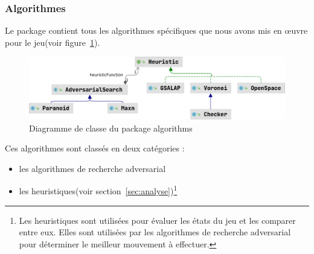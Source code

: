 \subsubsection{Algorithmes}
Le package   contient tous les algorithmes spécifiques que nous avons mis en œuvre pour le jeu(voir figure~\ref{fig:algorithms}).
\begin{figure}[H]
	\centering
	\includegraphics[scale=0.3]{diagrames/algorithms}
	\caption{Diagramme de classe du package algorithms}
	\label{fig:algorithms}
\end{figure}

Ces algorithmes sont classés en deux catégories :
\begin{itemize}
	\item les algorithmes de recherche adversarial
	\item les heuristiques(voir section~\ref{sec:analyse})\footnote{Les heuristiques sont utilisées pour évaluer les états du jeu et les comparer entre eux. Elles sont utilisées par les algorithmes de recherche adversarial pour
	déterminer le meilleur mouvement à effectuer.}
\end{itemize}

